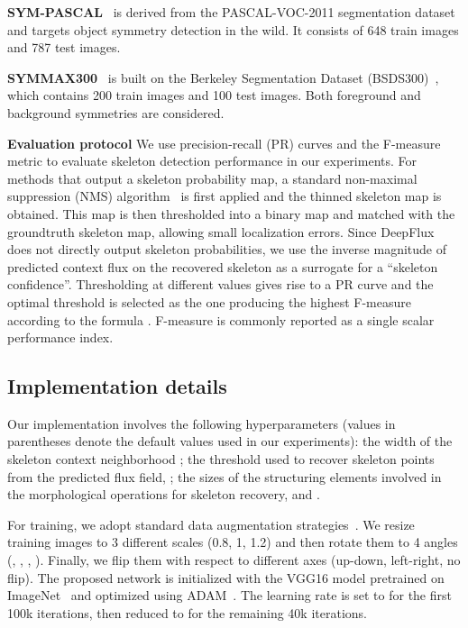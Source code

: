 \documentclass[10pt,twocolumn,letterpaper]{article}
\begin{document}
{\medskip

\noindent\textbf{SYM-PASCAL}~\cite{ke2017srn} is derived from the PASCAL-VOC-2011 segmentation dataset~\cite{everingham2010pascalvoc} and targets object symmetry detection in the wild.
It consists of 648 train images and 787 test images.


\medskip

\noindent\textbf{SYMMAX300}~\cite{tsogkas2012mil} is built on the Berkeley Segmentation Dataset (BSDS300)~\cite{martin2001bsds}, which contains 200 train images and 100 test images.
Both foreground and background symmetries are considered.


\medskip

\noindent\textbf{Evaluation protocol}
We use precision-recall (PR) curves and the F-measure metric to evaluate skeleton detection performance in our experiments.
For methods that output a skeleton probability map, a standard non-maximal suppression (NMS) algorithm~\cite{dollar2015nms} is first applied and the thinned skeleton map is obtained.
This map is then thresholded into a binary map and matched with the groundtruth skeleton map, allowing small localization errors.
Since DeepFlux does not directly output skeleton probabilities, we use the inverse magnitude of predicted context flux on the recovered skeleton as a surrogate for a ``skeleton confidence''.
Thresholding at different values gives rise to a PR curve and the optimal threshold is selected as the one producing the highest F-measure according to the formula .
F-measure is commonly reported as a single scalar performance index.

\subsection{Implementation details} \label{sec:implementation}
Our implementation involves the following hyperparameters (values in parentheses denote the default values used in our experiments):
the width of the skeleton context neighborhood ;
the threshold used to recover skeleton points from the predicted flux field, ;
the sizes of the structuring elements involved in the morphological operations for skeleton recovery,  and .

For training, we adopt standard data augmentation strategies~\cite{shen2016fsds,shen2017lmsds,zhao2018hifi}.
We resize training images to 3 different scales (0.8, 1, 1.2) and then rotate them to 4 angles (, , , ).
Finally, we flip them with respect to different axes (up-down, left-right, no flip).
The proposed network is initialized with the VGG16 model pretrained on ImageNet~\cite{imagenet} and optimized using ADAM~\cite{kinga2015adam}.
The learning rate is set to  for the first 100k iterations, then reduced to  for the remaining 40k iterations.

}
\end{document}
